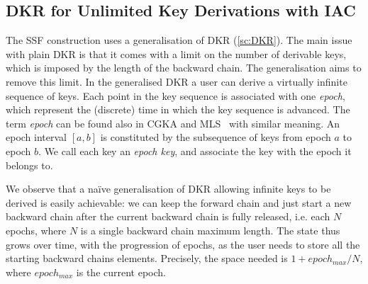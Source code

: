 \subsection{DKR for Unlimited Key Derivations with IAC}\label{sc:background-generalised-DKR}

The SSF construction uses a generalisation of DKR (\cref{sc:DKR}).
The main issue with plain DKR is that it comes with a limit
on the number of derivable keys, which is imposed by the
length of the backward chain. The generalisation aims to
remove this limit.
In the generalised DKR a user can derive a virtually infinite 
sequence of keys.
Each point in the key sequence is associated with one \textit{epoch}, 
which represent the (discrete) time in which the key sequence is advanced.
The term \textit{epoch} can be found also in CGKA and 
MLS~\cite{rfc9420} with similar meaning.
An epoch interval $[a, b]$ is constituted by the subsequence of keys
from epoch $a$ to epoch $b$. We call each key an \textit{epoch key}, and associate
the key with the epoch it belongs to.

We observe that a na\"ive generalisation of DKR allowing
infinite keys to be derived is easily achievable: we can keep the 
forward chain and just start a new backward chain after the 
current backward chain is fully released,
i.e. each $N$ epochs, where $N$ is a single backward chain maximum length.
The state thus grows over time, with the progression of epochs, as the 
user needs to store all the starting backward chains elements. 
Precisely, the space needed is $1 + epoch_{max} / N$, 
where $epoch_{max}$ is the current epoch.

